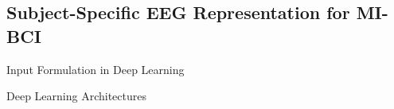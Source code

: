 \documentclass[aspectratio=169]{beamer}
\begin{document}
\subsection{Subject-Specific EEG Representation for MI-BCI}


\begin{frame}{Input Formulation in Deep Learning}
    \begin{figure}[!ht]
        \centering
    \end{figure}
\end{frame}


\begin{frame}{Deep Learning Architectures}
    \begin{figure}[!ht]
        \centering
    \end{figure}
\end{frame}
\end{document}
